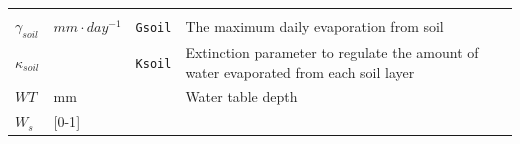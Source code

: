 \documentclass[]{book}
\begin{document}
\begin{longtable}[]{@{}llll@{}}
\begin{minipage}[t]{0.45\columnwidth}
\end{minipage}\tabularnewline
\begin{minipage}[t]{0.11\columnwidth}\raggedright\strut
\(\gamma_{soil}\)\strut
\end{minipage} & \begin{minipage}[t]{0.10\columnwidth}\raggedright\strut
\(mm \cdot day^{-1}\)\strut
\end{minipage} & \begin{minipage}[t]{0.12\columnwidth}\raggedright\strut
\texttt{Gsoil}\strut
\end{minipage} & \begin{minipage}[t]{0.45\columnwidth}\raggedright\strut
The maximum daily evaporation from soil\strut
\end{minipage}\tabularnewline
\begin{minipage}[t]{0.11\columnwidth}\raggedright\strut
\(\kappa_{soil}\)\strut
\end{minipage} & \begin{minipage}[t]{0.10\columnwidth}\raggedright\strut
\strut
\end{minipage} & \begin{minipage}[t]{0.12\columnwidth}\raggedright\strut
\texttt{Ksoil}\strut
\end{minipage} & \begin{minipage}[t]{0.45\columnwidth}\raggedright\strut
Extinction parameter to regulate the amount of water evaporated from
each soil layer\strut
\end{minipage}\tabularnewline
\begin{minipage}[t]{0.11\columnwidth}\raggedright\strut
\(WT\)\strut
\end{minipage} & \begin{minipage}[t]{0.10\columnwidth}\raggedright\strut
mm\strut
\end{minipage} & \begin{minipage}[t]{0.12\columnwidth}\raggedright\strut
\strut
\end{minipage} & \begin{minipage}[t]{0.45\columnwidth}\raggedright\strut
Water table depth\strut
\end{minipage}\tabularnewline
\begin{minipage}[t]{0.11\columnwidth}\raggedright\strut
\(W_{s}\)\strut
\end{minipage} & \begin{minipage}[t]{0.10\columnwidth}\raggedright\strut
{[}0-1{]}\strut
\end{minipage} & \begin{minipage}[t]{0.12\columnwidth}\raggedright\strut

\end{minipage}
\end{longtable}
\end{document}
